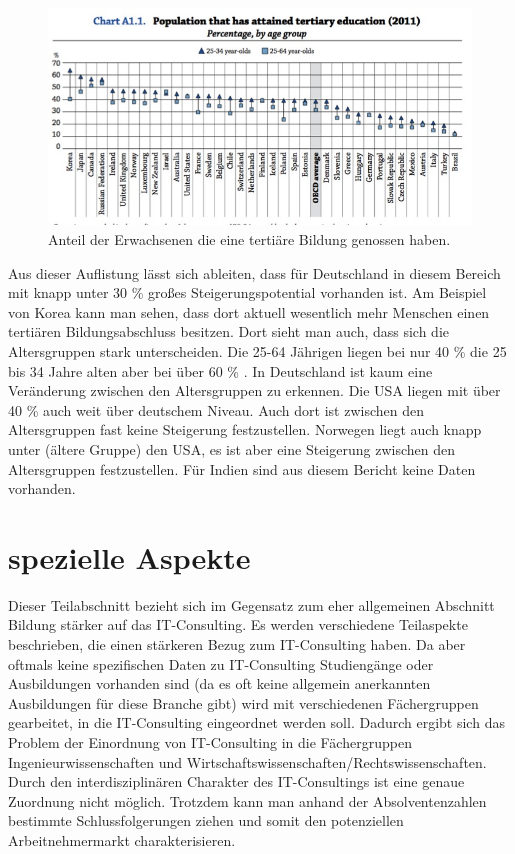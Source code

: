 \begin{figure}[H]
\includegraphics[width=15cm]{./images/tertiary.jpg}
\center
\caption{Anteil der Erwachsenen die eine tertiäre Bildung genossen haben. \cite[26]{oecd5} }
\end{figure}
Aus dieser Auflistung lässt sich ableiten, dass für Deutschland in diesem Bereich mit knapp unter 30 \% großes Steigerungspotential vorhanden ist.
Am Beispiel von Korea kann man sehen, dass dort aktuell wesentlich mehr Menschen einen tertiären Bildungsabschluss besitzen. Dort sieht man auch, dass sich die Altersgruppen stark unterscheiden. Die 25-64 Jährigen liegen bei nur 40 \% die 25 bis 34 Jahre alten aber bei über 60 \% . In Deutschland ist kaum eine Veränderung zwischen den Altersgruppen zu erkennen.
Die USA liegen mit über 40 \% auch weit über deutschem Niveau. Auch dort ist zwischen den Altersgruppen fast keine Steigerung festzustellen.
Norwegen liegt auch knapp unter (ältere Gruppe) den USA, es ist aber eine Steigerung zwischen den Altersgruppen festzustellen.
Für Indien sind aus diesem Bericht keine Daten vorhanden.

 \section{spezielle Aspekte}
Dieser Teilabschnitt bezieht sich im Gegensatz zum eher allgemeinen Abschnitt Bildung stärker auf das IT-Consulting. Es werden verschiedene Teilaspekte beschrieben, die einen stärkeren Bezug zum IT-Consulting haben. Da aber oftmals keine spezifischen Daten zu IT-Consulting Studiengänge oder Ausbildungen vorhanden sind (da es oft keine allgemein anerkannten Ausbildungen für diese Branche gibt) wird mit verschiedenen Fächergruppen gearbeitet, in die IT-Consulting eingeordnet werden soll. 
Dadurch ergibt sich das Problem der Einordnung von IT-Consulting in die Fächergruppen Ingenieurwissenschaften und Wirtschaftswissenschaften/Rechtswissenschaften. Durch den interdisziplinären Charakter des IT-Consultings ist eine genaue Zuordnung nicht möglich. Trotzdem kann man anhand der Absolventenzahlen bestimmte Schlussfolgerungen ziehen und somit den potenziellen Arbeitnehmermarkt charakterisieren.

